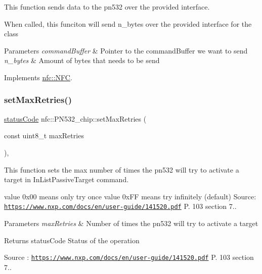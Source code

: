 This function sends data to the pn532 over the provided interface. 

When called, this funciton will send n\+\_\+bytes over the provided interface for the class 
\begin{DoxyParams}{Parameters}
{\em command\+Buffer} & Pointer to the command\+Buffer we want to send \\
\hline
{\em n\+\_\+bytes} & Amount of bytes that needs to be send \\
\hline
\end{DoxyParams}


Implements \hyperlink{classnfc_1_1NFC_af8fe01b21da65e4e8334f802073168ab}{nfc\+::\+N\+FC}.

\mbox{\label{classnfc_1_1PN532__chip_ae418a2f5fc2d4d344264fe2ec549f912}} 
\subsubsection{\texorpdfstring{set\+Max\+Retries()}{setMaxRetries()}}
{\footnotesize\ttfamily \hyperlink{declarations_8h_ae1d20c5a38cae82ccaa6a77be3fd264b}{status\+Code} nfc\+::\+P\+N532\+\_\+chip\+::set\+Max\+Retries (\begin{DoxyParamCaption}\item[{const uint8\+\_\+t}]{max\+Retries }\end{DoxyParamCaption})\hspace{0.3cm}{\ttfamily [override]}, {\ttfamily [virtual]}}



This function sets the max number of times the pn532 will try to activate a target in In\+List\+Passive\+Target command. 

value 0x00 means only try once value 0x\+FF means try infinitely (default) Source\+: \href{https://www.nxp.com/docs/en/user-guide/141520.pdf}{\tt https\+://www.\+nxp.\+com/docs/en/user-\/guide/141520.\+pdf} P. 103 section 7.. 
\begin{DoxyParams}{Parameters}
{\em max\+Retries} & Number of times the pn532 will try to activate a target \\
\hline
\end{DoxyParams}
\begin{DoxyReturn}{Returns}
status\+Code Status of the operation 
\end{DoxyReturn}
Source \+: \href{https://www.nxp.com/docs/en/user-guide/141520.pdf}{\tt https\+://www.\+nxp.\+com/docs/en/user-\/guide/141520.\+pdf} P. 103 section 7.. 

